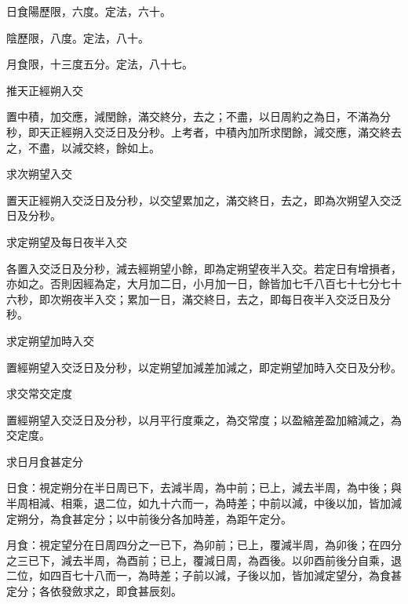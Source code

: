 \begin{pinyinscope}
 日食陽歷限，六度。定法，六十。



 陰歷限，八度。定法，八十。



 月食限，十三度五分。定法，八十七。



 推天正經朔入交



 置中積，加交應，減閏餘，滿交終分，去之；不盡，以日周約之為日，不滿為分秒，即天正經朔入交泛日及分秒。上考者，中積內加所求閏餘，減交應，滿交終去之，不盡，以減交終，餘如上。



 求次朔望入交



 置天正經朔入交泛日及分秒，以交望累加之，滿交終日，去之，即為次朔望入交泛日及分秒。



 求定朔望及每日夜半入交



 各置入交泛日及分秒，減去經朔望小餘，即為定朔望夜半入交。若定日有增損者，亦如之。否則因經為定，大月加二日，小月加一日，餘皆加七千八百七十七分七十六秒，即次朔夜半入交；累加一日，滿交終日，去之，即每日夜半入交泛日及分秒。



 求定朔望加時入交



 置經朔望入交泛日及分秒，以定朔望加減差加減之，即定朔望加時入交日及分秒。



 求交常交定度



 置經朔望入交泛日及分秒，以月平行度乘之，為交常度；以盈縮差盈加縮減之，為交定度。



 求日月食甚定分



 日食：視定朔分在半日周已下，去減半周，為中前；已上，減去半周，為中後；與半周相減、相乘，退二位，如九十六而一，為時差；中前以減，中後以加，皆加減定朔分，為食甚定分；以中前後分各加時差，為距午定分。



 月食：視定望分在日周四分之一已下，為卯前；已上，覆減半周，為卯後；在四分之三已下，減去半周，為酉前；已上，覆減日周，為酉後。以卯酉前後分自乘，退二位，如四百七十八而一，為時差；子前以減，子後以加，皆加減定望分，為食甚定分；各依發斂求之，即食甚辰刻。




\end{pinyinscope}
